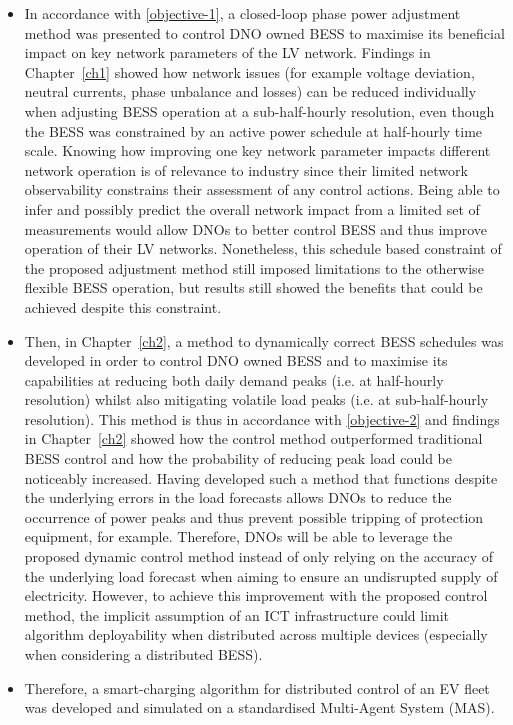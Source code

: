 \begin{itemize}
	\item
	In accordance with \ref{objective-1}, a closed-loop phase power adjustment method was presented to control DNO owned BESS to maximise its beneficial impact on key network parameters of the LV network.
	Findings in Chapter~\ref{ch1} showed how network issues (for example voltage deviation, neutral currents, phase unbalance and losses) can be reduced individually when adjusting BESS operation at a sub-half-hourly resolution, even though the BESS was constrained by an active power schedule at half-hourly time scale.
	Knowing how improving one key network parameter impacts different network operation is of relevance to industry since their limited network observability constrains their assessment of any control actions.
	Being able to infer and possibly predict the overall network impact from a limited set of measurements would allow DNOs to better control BESS and thus improve operation of their LV networks.
	Nonetheless, this schedule based constraint of the proposed adjustment method still imposed limitations to the otherwise flexible BESS operation, but results still showed the benefits that could be achieved despite this constraint.
	\item
	Then, in Chapter~\ref{ch2}, a method to dynamically correct BESS schedules was developed in order to control DNO owned BESS and to maximise its capabilities at reducing both daily demand peaks (i.e. at half-hourly resolution) whilst also mitigating volatile load peaks (i.e. at sub-half-hourly resolution).
	This method is thus in accordance with \ref{objective-2} and findings in  Chapter~\ref{ch2} showed how the control method outperformed traditional BESS control and how the probability of reducing peak load could be noticeably increased.
	Having developed such a method that functions despite the underlying errors in the load forecasts allows DNOs to reduce the occurrence of power peaks and thus prevent possible tripping of protection equipment, for example.
	Therefore, DNOs will be able to leverage the proposed dynamic control method instead of only relying on the accuracy of the underlying load forecast when aiming to ensure an undisrupted supply of electricity.
	However, to achieve this improvement with the proposed control method, the implicit assumption of an ICT infrastructure could limit algorithm deployability when distributed across multiple devices (especially when considering a distributed BESS).
	\item
	Therefore, a smart-charging algorithm for distributed control of an EV fleet was developed and simulated on a standardised Multi-Agent System (MAS).

\end{itemize}
